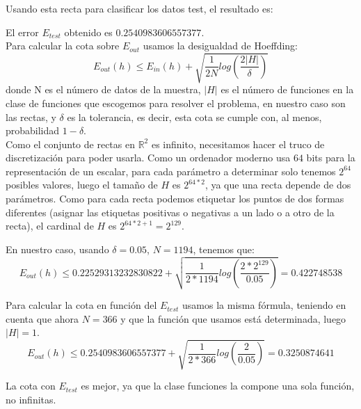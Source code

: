 \documentclass{article}
\begin{document}
Usando esta recta para clasificar los datos test, el resultado es:

\begin{figure}[H]
  \centering
\end{figure}

El error $E_{test}$ obtenido es $0.2540983606557377$.\\

Para calcular la cota sobre $E_{out}$ usamos la desigualdad de Hoeffding:
$$E_{out}(h) \leq E_{in}(h) + \sqrt{\frac{1}{2N}log(\frac{2|H|}{\delta})} $$
donde N es el número de datos de la muestra, $|H|$ es el número de funciones en la clase de funciones que escogemos para resolver el problema, en nuestro caso son las rectas, y $\delta$ es la tolerancia, es decir, esta cota se cumple con, al menos, probabilidad $1-\delta$.\\

Como el conjunto de rectas en $\mathds{R}^2$ es infinito, necesitamos hacer el truco de discretización para poder usarla. Como un ordenador moderno usa $64$ bits para la representación de un escalar, para cada parámetro a determinar solo tenemos $2^{64}$ posibles valores, luego el tamaño de $H$ es $2^{64*2}$, ya que una recta depende de dos parámetros. Como para cada recta podemos etiquetar los puntos de dos formas diferentes (asignar las etiquetas positivas o negativas a un lado o a otro de la recta), el cardinal de $H$ es $2^{64*2+1} = 2^{129} $.

En nuestro caso, usando $\delta = 0.05$, $N=1194$, tenemos que:
$$E_{out}(h) \leq 0.22529313232830822 + \sqrt{\frac{1}{2*1194}log(\frac{2*2^{129}}{0.05})} = 0.422748538 $$

Para calcular la cota en función del $E_{test}$ usamos la misma fórmula, teniendo en cuenta que ahora $N=366$ y que la función que usamos está determinada, luego $|H| = 1$.
$$E_{out}(h) \leq 0.2540983606557377 + \sqrt{\frac{1}{2*366}log(\frac{2}{0.05})} = 0.3250874641$$

La cota con $E_{test}$ es mejor, ya que la clase funciones la compone una sola función, no infinitas.
\end{document}
